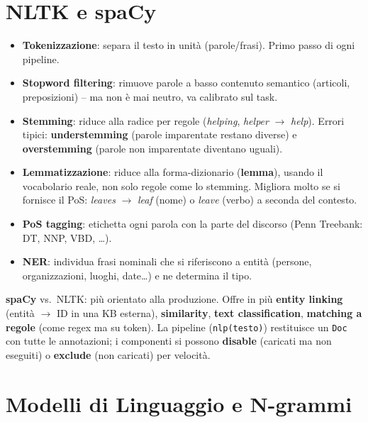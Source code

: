\documentclass[11pt,a4paper]{article}
\begin{document}
\section{NLTK e spaCy}

\begin{itemize}
  \item \textbf{Tokenizzazione}: separa il testo in unit\`a (parole/frasi). Primo passo di ogni pipeline.
  \item \textbf{Stopword filtering}: rimuove parole a basso contenuto semantico (articoli, preposizioni) -- ma non \`e mai neutro, va calibrato sul task.
  \item \textbf{Stemming}: riduce alla radice per regole (\textit{helping}, \textit{helper} $\to$ \textit{help}). Errori tipici: \textbf{understemming} (parole imparentate restano diverse) e \textbf{overstemming} (parole non imparentate diventano uguali).
  \item \textbf{Lemmatizzazione}: riduce alla forma-dizionario (\textbf{lemma}), usando il vocabolario reale, non solo regole come lo stemming. Migliora molto se si fornisce il PoS: \textit{leaves} $\to$ \textit{leaf} (nome) o \textit{leave} (verbo) a seconda del contesto.
  \item \textbf{PoS tagging}: etichetta ogni parola con la parte del discorso (Penn Treebank: DT, NNP, VBD, \ldots).
  \item \textbf{NER}: individua frasi nominali che si riferiscono a entit\`a (persone, organizzazioni, luoghi, date\ldots) e ne determina il tipo.
\end{itemize}

\textbf{spaCy} vs.\ NLTK: pi\`u orientato alla produzione. Offre in pi\`u \textbf{entity linking} (entit\`a $\to$ ID in una KB esterna), \textbf{similarity}, \textbf{text classification}, \textbf{matching a regole} (come regex ma su token). La pipeline (\texttt{nlp(testo)}) restituisce un \texttt{Doc} con tutte le annotazioni; i componenti si possono \textbf{disable} (caricati ma non eseguiti) o \textbf{exclude} (non caricati) per velocit\`a.

\section{Modelli di Linguaggio e N-grammi}
\end{document}

